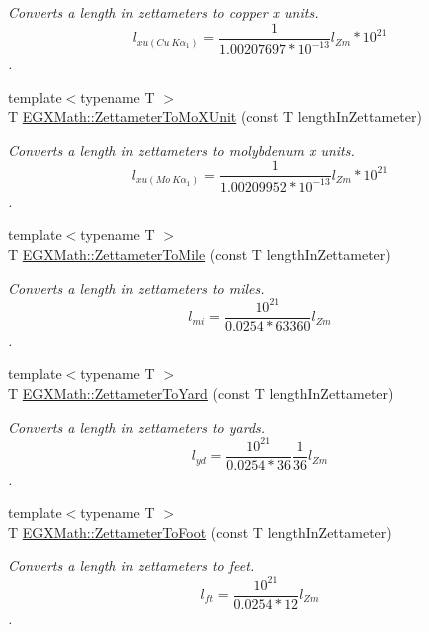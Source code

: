 \begin{DoxyCompactItemize}
\begin{DoxyCompactList}\small\item\em Converts a length in zettameters to copper x units. \[ l_{xu(Cu\ K\alpha_1)}= \frac{1}{1.00207697*10^{-13}} l_{Zm} * 10^{21}\]. \end{DoxyCompactList}\item 
{\footnotesize template$<$typename T $>$ }\\T \mbox{\hyperlink{group___e_g_x_math-_conversions-_length_conversions-_s_i-_zettameter-_non-_s_i_ga10039261b7de3417e69110a56312b9ef}{E\+G\+X\+Math\+::\+Zettameter\+To\+Mo\+X\+Unit}} (const T length\+In\+Zettameter)
\begin{DoxyCompactList}\small\item\em Converts a length in zettameters to molybdenum x units. \[ l_{xu(Mo\ K\alpha_1)}=\frac{1}{1.00209952*10^{-13}} l_{Zm} * 10^{21}\]. \end{DoxyCompactList}\item 
{\footnotesize template$<$typename T $>$ }\\T \mbox{\hyperlink{group___e_g_x_math-_conversions-_length_conversions-_s_i-_zettameter-_imperial_ga217b12dd9c920150cbcf50413e98dd47}{E\+G\+X\+Math\+::\+Zettameter\+To\+Mile}} (const T length\+In\+Zettameter)
\begin{DoxyCompactList}\small\item\em Converts a length in zettameters to miles. \[ l_{mi}=\frac{10^{21}}{0.0254 * 63360} l_{Zm} \]. \end{DoxyCompactList}\item 
{\footnotesize template$<$typename T $>$ }\\T \mbox{\hyperlink{group___e_g_x_math-_conversions-_length_conversions-_s_i-_zettameter-_imperial_gaf0f61cf5764afa5022579c2e638a0c2e}{E\+G\+X\+Math\+::\+Zettameter\+To\+Yard}} (const T length\+In\+Zettameter)
\begin{DoxyCompactList}\small\item\em Converts a length in zettameters to yards. \[ l_{yd}= \frac{10^{21}}{0.0254 * 36} \frac{1}{36} l_{Zm} \]. \end{DoxyCompactList}\item 
{\footnotesize template$<$typename T $>$ }\\T \mbox{\hyperlink{group___e_g_x_math-_conversions-_length_conversions-_s_i-_zettameter-_imperial_ga2b64ad3efd85a1800a76661d05487a09}{E\+G\+X\+Math\+::\+Zettameter\+To\+Foot}} (const T length\+In\+Zettameter)
\begin{DoxyCompactList}\small\item\em Converts a length in zettameters to feet. \[ l_{ft}= \frac{10^{21}}{0.0254 * 12} l_{Zm} \]. \end{DoxyCompactList}\item 

\end{DoxyCompactItemize}
